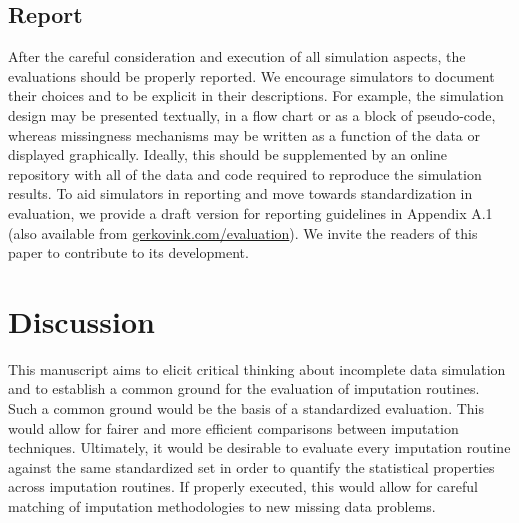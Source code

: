 \documentclass[bimj,fleqn]{w-art}
\begin{document}



\subsection{Report}

After the careful consideration and execution of all simulation aspects, the evaluations should be properly reported. We encourage simulators to document their choices and to be explicit in their descriptions. For example, the simulation design may be presented textually, in a flow chart or as a block of pseudo-code, whereas missingness mechanisms may be written as a function of the data or displayed graphically. Ideally, this should be supplemented by an online repository with all of the data and code required to reproduce the simulation results. To aid simulators in reporting and move towards standardization in evaluation, we provide a draft version for reporting guidelines in Appendix A.1 (also available from \underline{gerkovink.com/evaluation}). We invite the readers of this paper to contribute to its development. 




\section{Discussion}

This manuscript aims to elicit critical thinking about incomplete data simulation and to establish a common ground for the evaluation of imputation routines. Such a common ground would be the basis of a standardized evaluation. This would allow for fairer and more efficient comparisons between imputation techniques. Ultimately, it would be desirable to evaluate every imputation routine against the same standardized set in order to quantify the statistical properties across imputation routines. If properly executed, this would allow for careful matching of imputation methodologies to new missing data problems. 
\end{document}

